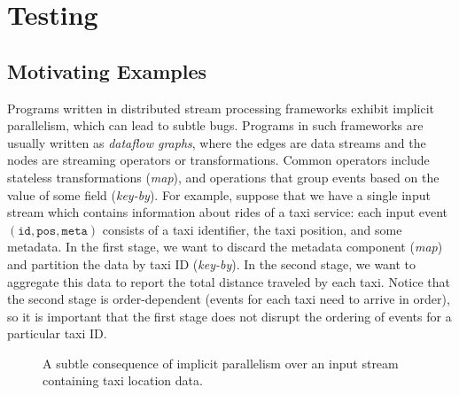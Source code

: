\section{Testing}
\label{sec:testing}

\subsection{Motivating Examples}
\label{ssec:motivating-examples}

Programs written in distributed stream processing frameworks exhibit implicit parallelism, which can lead to subtle bugs. Programs in such frameworks are usually written as \emph{dataflow graphs}, where the edges are data streams and the nodes are streaming operators or transformations.
Common operators include stateless transformations (\emph{map}), and operations that group events based on the value of some field (\emph{key-by}).
For example, suppose that we have a single input stream which contains information about rides of a taxi service: each input event $(\texttt{id}, \texttt{pos}, \texttt{meta})$ consists of a taxi identifier, the taxi position, and some metadata. In the first stage, we want to discard the metadata component (\emph{map}) and partition the data by taxi ID (\emph{key-by}). In the second stage, we want to aggregate this data to report the total distance traveled by each taxi. Notice that the second stage is order-dependent (events for each taxi need to arrive in order), so it is important that the first stage does not disrupt the ordering of events for a particular taxi ID.

\begin{figure}[tb]
\centering
{}

\smallskip


\caption{A subtle consequence of implicit parallelism
over an input stream containing taxi location data.
}
\label{ex:overview-simple}
\end{figure}

